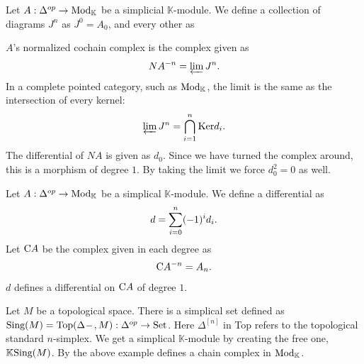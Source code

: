\documentclass[../thesis.tex]{subfiles}
\begin{document}
            \begin{example}
                Let $A : \Delta^{op} \rightarrow \tt{Mod}_\mathbb{K}$ be a simplicial $\mathbb{K}$-module.  We define a collection of diagrams $J^n$ as $J^0 = A_0$, and every other as
                \begin{center}
                \end{center}
                $A$'s normalized cochain complex is the complex given as
                \begin{align*}
                    NA^{-n} = \varprojlim J^n\tt{.}
                \end{align*}
                In a complete pointed category, such as $\tt{Mod}_\mathbb{K}$, the limit is the same as the intersection of every kernel:
                \begin{align*}
                    \varprojlim J^n = \bigcap_{i=1}^n\tt{Ker}d_i\tt{.}
                \end{align*}
                The differential of $NA$ is given as $d_0$. Since we have turned the complex around, this is a morphism of degree $1$. By taking the limit we force $d_0^2 = 0$ as well.
            \end{example}
            \begin{example}\label{ex: ass-complex}
                Let $A : \Delta^{op} \rightarrow \tt{Mod}_\mathbb{K}$ be a simplical $\mathbb{K}$-module. We define a differential as
                \begin{align*}
                    d = \sum_{i=0}^n(-1)^id_i\tt{.}
                \end{align*}
                Let $\tt{C}A$ be the complex given in each degree as
                \begin{align*}
                    \tt{C}A^{-n} = A_n\tt{.}
                \end{align*}
                $d$ defines a differential on $\tt{C}A$ of degree $1$.
            \end{example}
            \begin{example}
                Let $M$ be a topological space. There is a simplical set defined as $\tt{Sing}(M) = \tt{Top}(\Delta^{\argument},M) : \Delta^{op} \rightarrow \tt{Set}$. Here $\Delta^{[n]}$ in Top refers to the topological standard $n$-simplex. We get a simplical $\mathbb{K}$-module by creating the free one, $\mathbb{K}\tt{Sing}(M)$. By the above example defines a chain complex in $\tt{Mod}_\mathbb{K}$.
            \end{example}
\end{document}
